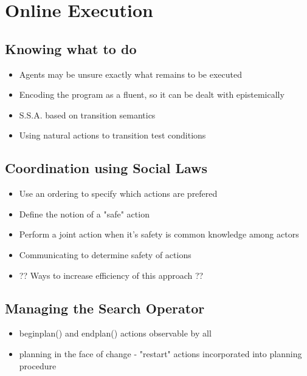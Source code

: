 \chapter{Online Execution}\label{ch:online-exec}

\section{Knowing what to do}
\begin{itemize}
\item Agents may be unsure exactly what remains to be executed
\item Encoding the program as a fluent, so it can be dealt with epistemically
\item S.S.A. based on transition semantics
\item Using natural actions to transition test conditions
\end{itemize}

\section{Coordination using Social Laws}
\begin{itemize}
\item Use an ordering to specify which actions are prefered
\item Define the notion of a "safe" action
\item Perform a joint action when it's safety is common knowledge among actors
\item Communicating to determine safety of actions
\item ?? Ways to increase efficiency of this approach ??
\end{itemize}

\section{Managing the Search Operator}
\begin{itemize}
\item beginplan() and endplan() actions observable by all
\item planning in the face of change - "restart" actions incorporated into planning procedure
\end{itemize}

